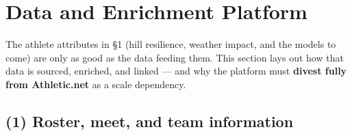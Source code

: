 \section{Data and Enrichment Platform}
\label{sec:platform}

The athlete attributes in \S1 (hill resilience, weather impact, and the models
to come) are only as good as the data feeding them. This section lays out how
that data is sourced, enriched, and linked --- and why the platform must
\textbf{divest fully from Athletic.net} as a scale dependency.

\subsection{(1) Roster, meet, and team information}

